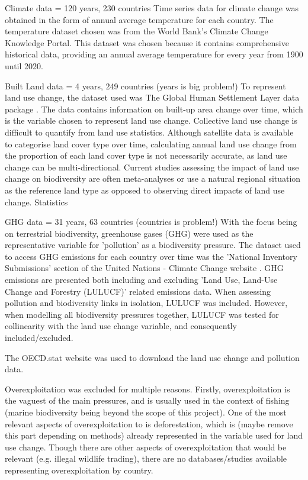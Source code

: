 \documentclass[11pt, a4paper, titlepage]{article}
\begin{document}
	Climate data = 120 years, 230 countries
	Time series data for climate change was obtained in the form of annual average temperature for each country. The temperature dataset chosen was from the World Bank's Climate Change Knowledge Portal. This dataset was chosen because it contains comprehensive historical data, providing an annual average temperature for every year from 1900 until 2020. \newline
	
	Built Land data = 4 years, 249 countries (years is big problem!)
	To represent land use change, the dataset used was The Global Human Settlement Layer data package \citep{JRC117104}. The data contains information on built-up area change over time, which is the variable chosen to represent land use change. Collective land use change is difficult to quantify from land use statistics. Although satellite data is available to categorise land cover type over time, calculating annual land use change from the proportion of each land cover type is not necessarily accurate, as land use change can be multi-directional. Current studies assessing the impact of land use change on biodiversity are often meta-analyses or use a natural regional situation as the reference land type \citep{de2013land} as opposed to observing direct impacts of land use change. Statistics \newline
	
	GHG data = 31 years, 63 countries (countries is problem!)
	With the focus being on terrestrial biodiversity, greenhouse gases (GHG) were used as the representative variable for 'pollution' as a biodiversity pressure. The dataset used to access GHG emissions for each country over time was the 'National Inventory Submissions' section of the United Nations - Climate Change website \citep{united nations}. GHG emissions are presented both including and excluding 'Land Use, Land-Use Change and Forestry (LULUCF)' related emissions data. When assessing pollution and biodiversity links in isolation, LULUCF was included. However, when modelling all biodiversity pressures together, LULUCF was tested for collinearity with the land use change variable, and consequently included/excluded. \newline
	
	The OECD.stat website was used to download the land use change and pollution data. \newline
	
	Overexploitation was excluded for multiple reasons. Firstly, overexploitation is the vaguest of the main pressures, and is usually used in the context of fishing (marine biodiversity being beyond the scope of this project). One of the most relevant aspects of overexploitation to is deforestation, which is (maybe remove this part depending on methods) already represented in the variable used for land use change. Though there are other aspects of overexploitation that would be relevant (e.g. illegal wildlife trading), there are no databases/studies available representing overexploitation by country.
\end{document}

